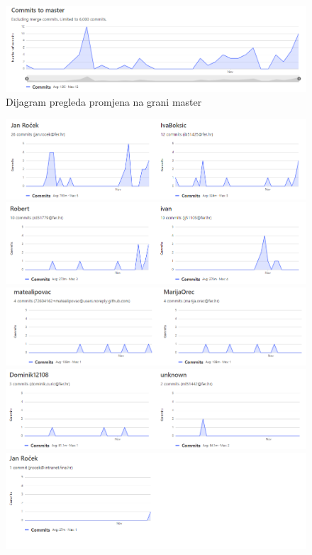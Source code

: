 		\begin{figure}[H]
			\begin{center}
				\includegraphics[width=15cm]{slike/master.png}
			\end{center}
			\caption{Dijagram pregleda promjena na grani master}
			\label{fig:master}
		\end{figure}
		
		\begin{figure}[H]
			\begin{center}
				\includegraphics[width=15cm]{slike/master1.PNG}
				\includegraphics[width=15cm]{slike/master2.PNG}
				\includegraphics[width=15cm]{slike/master3.PNG}
				\includegraphics[width=15cm]{slike/master4.PNG}
				\includegraphics[width=15cm]{slike/master5.PNG}
			\end{center}
			\label{fig:dijapre}
		\end{figure}
	
	